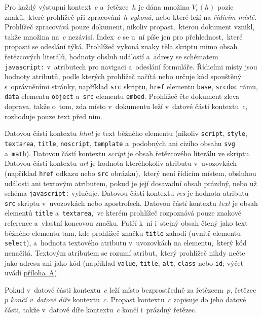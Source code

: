 \begin{predpoklad}
\label{ass:parse}
Pro každý výstupní kontext~$c$ a~řetězec~$h$ je dána množina $V_c(h)$ pozic znaků,~které prohlížeč při zpracování~$h$ \emph{vykoná}, nebo které leží na \emph{řídicím místě}. Prohlížeč zpracovává pouze dokument, nikoliv propast,~kterou dokument vznikl, takže množina na~$c$ nezávisí. Index~$c$ se u~ní píše jen pro přehlednost,~které propasti se odeslání týká. Prohlížeč vykoná znaky těla skriptu mimo obsah řetězcových literálů, hodnoty obsluh událostí a~adresy se schématem \texttt{javascript:} v~atributech pro navigaci a~odeslání formuláře. Řídicími místy jsou hodnoty atributů, podle kterých prohlížeč načítá nebo určuje kód spouštěný s~oprávněními stránky, například \texttt{src} skriptu, \texttt{href} elementu \texttt{base}, \texttt{srcdoc} rámu, \texttt{data} elementu \texttt{object} a~\texttt{src} elementu \texttt{embed}. Prohlížeč čte dokument zleva doprava, takže o~tom, zda místo v~dokumentu leží v~datové části kontextu~$c$, rozhoduje pouze text před ním.

Datovou částí kontextu \emph{html} je text běžného elementu (nikoliv \texttt{script}, \texttt{style}, \texttt{textarea}, \texttt{title}, \texttt{noscript}, \texttt{template} a~podobných ani cizího obsahu \texttt{svg} a~\texttt{math}). Datovou částí kontextu \emph{script} je obsah řetězcového literálu ve skriptu. Datovou částí kontextu \emph{url} je hodnota kteréhokoliv atributu v~uvozovkách (například \texttt{href} odkazu nebo \texttt{src} obrázku),~který není řídicím místem, obsluhou události ani textovým atributem, pokud je její dosavadní obsah prázdný, nebo už schéma \texttt{javascript:} vylučuje. Datovou částí kontextu \emph{res} je hodnota atributu \texttt{src} skriptu v~uvozovkách nebo apostrofech. Datovou částí kontextu \emph{text} je obsah elementů \texttt{title} a~\texttt{textarea},~ve kterém prohlížeč rozpoznává pouze znakové reference a~vlastní koncovou značku. Patří k~ní i~stejný obsah čtený jako text běžného elementu tam, kde prohlížeč značku \texttt{title} zahodí (uvnitř elementu \texttt{select}), a~hodnota textového atributu v~uvozovkách na elementu,~který kód nenačítá. Textovým atributem se rozumí atribut,~který prohlížeč nikdy nečte jako adresu ani jako kód (například \texttt{value}, \texttt{title}, \texttt{alt}, \texttt{class} nebo \texttt{id}; výčet uvádí \hyperref[app:own-work]{příloha~A}).

Pokud v~datové části kontextu~$c$ leží místo bezprostředně za řetězcem~$p$, řetězec~$p$ \emph{končí v~datové díře} kontextu~$c$. Propast kontextu~$c$ zapisuje do jeho datové části, takže v~datové díře kontextu~$c$ končí i~prázdný řetězec.
\end{predpoklad}

